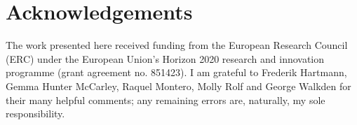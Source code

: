 \hypertarget{acknowledgements}{%
\section*{Acknowledgements}\label{acknowledgements}}

The work presented here received funding from the European Research
Council (ERC) under the European Union's Horizon 2020 research and
innovation programme (grant agreement no. 851423). I am grateful to
Frederik Hartmann, Gemma Hunter McCarley, Raquel Montero, Molly Rolf and
George Walkden for their many helpful comments; any remaining errors
are, naturally, my sole responsibility.
